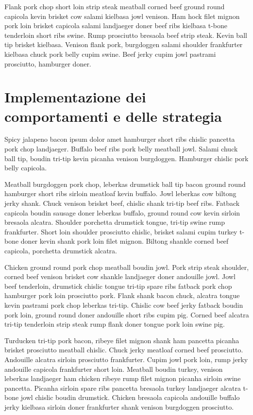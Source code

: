 \documentclass[a4paper]{article}
\begin{document}
Flank pork chop short loin strip steak meatball corned beef ground round capicola kevin brisket cow salami kielbasa jowl venison. Ham hock filet mignon pork loin brisket capicola salami landjaeger doner beef ribs kielbasa t-bone tenderloin short ribs swine. Rump prosciutto bresaola beef strip steak. Kevin ball tip brisket kielbasa. Venison flank pork, burgdoggen salami shoulder frankfurter kielbasa chuck pork belly cupim swine. Beef jerky cupim jowl pastrami prosciutto, hamburger doner.

\section{Implementazione dei comportamenti e delle strategia}

Spicy jalapeno bacon ipsum dolor amet hamburger short ribs chislic pancetta pork chop landjaeger. Buffalo beef ribs pork belly meatball jowl. Salami chuck ball tip, boudin tri-tip kevin picanha venison burgdoggen. Hamburger chislic pork belly capicola.

Meatball burgdoggen pork chop, leberkas drumstick ball tip bacon ground round hamburger short ribs sirloin meatloaf kevin buffalo. Jowl leberkas cow biltong jerky shank. Chuck venison brisket beef, chislic shank tri-tip beef ribs. Fatback capicola boudin sausage doner leberkas buffalo, ground round cow kevin sirloin bresaola alcatra. Shoulder porchetta drumstick tongue, tri-tip swine rump frankfurter. Short loin shoulder prosciutto chislic, brisket salami cupim turkey t-bone doner kevin shank pork loin filet mignon. Biltong shankle corned beef capicola, porchetta drumstick alcatra.

Chicken ground round pork chop meatball boudin jowl. Pork strip steak shoulder, corned beef venison brisket cow shankle landjaeger doner andouille jowl. Jowl beef tenderloin, drumstick chislic tongue tri-tip spare ribs fatback pork chop hamburger pork loin prosciutto pork. Flank shank bacon chuck, alcatra tongue kevin pastrami pork chop leberkas tri-tip. Chislic cow beef jerky fatback boudin pork loin, ground round doner andouille short ribs cupim pig. Corned beef alcatra tri-tip tenderloin strip steak rump flank doner tongue pork loin swine pig.

Turducken tri-tip pork bacon, ribeye filet mignon shank ham pancetta picanha brisket prosciutto meatball chislic. Chuck jerky meatloaf corned beef prosciutto. Andouille alcatra sirloin prosciutto frankfurter. Cupim jowl pork loin, rump jerky andouille capicola frankfurter short loin. Meatball boudin turkey, venison leberkas landjaeger ham chicken ribeye rump filet mignon picanha sirloin swine pancetta. Picanha sirloin spare ribs pancetta bresaola turkey landjaeger alcatra t-bone jowl chislic boudin drumstick. Chicken bresaola capicola andouille buffalo jerky kielbasa sirloin doner frankfurter shank venison burgdoggen prosciutto.
\end{document}
